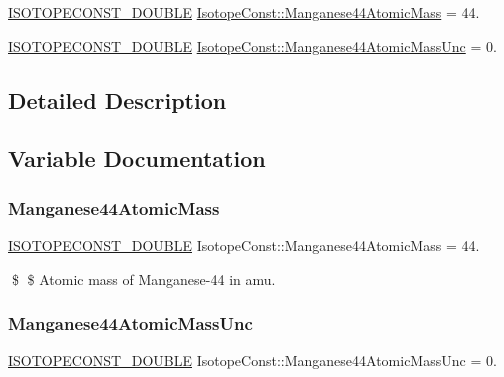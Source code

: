 \begin{DoxyCompactItemize}
\item 
\mbox{\hyperlink{group___isotope_const-_macros_ga8f45a7272ce02c0b4c65c44636ed719a}{I\+S\+O\+T\+O\+P\+E\+C\+O\+N\+S\+T\+\_\+\+D\+O\+U\+B\+LE}} \mbox{\hyperlink{group___isotope_const-_manganese-_mn44_ga30a829ae24fd02ded9e6db19b88d7e08}{Isotope\+Const\+::\+Manganese44\+Atomic\+Mass}} = 44.
\item 
\mbox{\hyperlink{group___isotope_const-_macros_ga8f45a7272ce02c0b4c65c44636ed719a}{I\+S\+O\+T\+O\+P\+E\+C\+O\+N\+S\+T\+\_\+\+D\+O\+U\+B\+LE}} \mbox{\hyperlink{group___isotope_const-_manganese-_mn44_ga37333918ec7d2d16c2badbd51b316392}{Isotope\+Const\+::\+Manganese44\+Atomic\+Mass\+Unc}} = 0.
\end{DoxyCompactItemize}


\subsection{Detailed Description}


\subsection{Variable Documentation}
\mbox{\label{group___isotope_const-_manganese-_mn44_ga30a829ae24fd02ded9e6db19b88d7e08}} 
\subsubsection{\texorpdfstring{Manganese44\+Atomic\+Mass}{Manganese44AtomicMass}}
{\footnotesize\ttfamily \mbox{\hyperlink{group___isotope_const-_macros_ga8f45a7272ce02c0b4c65c44636ed719a}{I\+S\+O\+T\+O\+P\+E\+C\+O\+N\+S\+T\+\_\+\+D\+O\+U\+B\+LE}} Isotope\+Const\+::\+Manganese44\+Atomic\+Mass = 44.}

\$ \$ Atomic mass of Manganese-\/44 in amu. \mbox{\label{group___isotope_const-_manganese-_mn44_ga37333918ec7d2d16c2badbd51b316392}} 
\subsubsection{\texorpdfstring{Manganese44\+Atomic\+Mass\+Unc}{Manganese44AtomicMassUnc}}
{\footnotesize\ttfamily \mbox{\hyperlink{group___isotope_const-_macros_ga8f45a7272ce02c0b4c65c44636ed719a}{I\+S\+O\+T\+O\+P\+E\+C\+O\+N\+S\+T\+\_\+\+D\+O\+U\+B\+LE}} Isotope\+Const\+::\+Manganese44\+Atomic\+Mass\+Unc = 0.}

